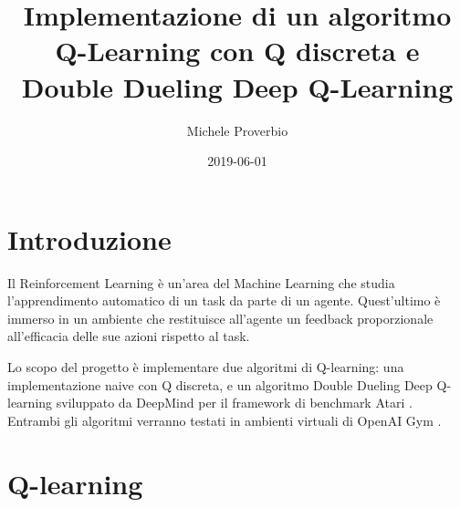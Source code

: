 \documentclass{article}
\title{Implementazione di un algoritmo Q-Learning con Q discreta e Double Dueling Deep Q-Learning}
\date{2019-06-01}
\author{Michele Proverbio}
\begin{document}
	\maketitle
	\newpage

	\section{Introduzione}
		Il Reinforcement Learning è un'area del Machine Learning che studia l'apprendimento automatico di un task da parte di un agente. Quest'ultimo è immerso in un ambiente che restituisce all'agente un feedback proporzionale all'efficacia delle sue azioni rispetto al task.

		Lo scopo del progetto è implementare due algoritmi di Q-learning: una implementazione naive con Q discreta, e un algoritmo Double Dueling Deep Q-learning \cite{1509.06461} \cite{1511.06581} sviluppato da DeepMind \cite{DeepMind} per il framework di benchmark Atari \cite{Atari}. Entrambi gli algoritmi verranno testati in ambienti virtuali di OpenAI Gym \cite{open.ai}.

	\section{Q-learning}
	\subsection{}

	\newpage
	{}
	
\end{document}
